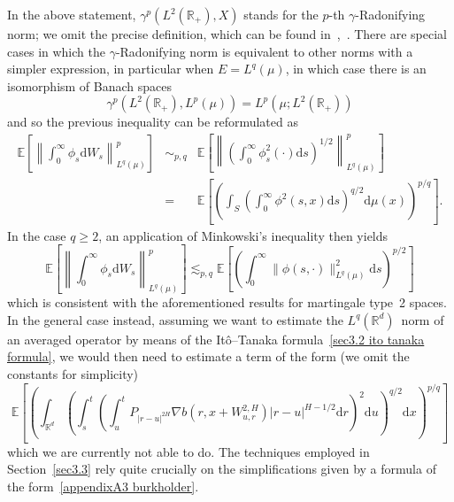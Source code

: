 \documentclass[10pt]{article}
\newcommand{\mathd}{\mathrm{d}}
\begin{document}
In the above statement, $\gamma^p (L^2 (\mathbb{R}_+), X)$ stands for the
$p$\mbox{-}th $\gamma$\mbox{-}Radonifying norm; we omit the precise
definition, which can be found
in~{\cite{vanneerven2007}},~{\cite{vanneerven2015}}. There are special cases
in which the $\gamma$-Radonifying norm is equivalent to other norms with a
simpler expression, in particular when $E = L^q (\mu)$, in which case there is
an isomorphism of Banach spaces
\[ \gamma^p (L^2 (\mathbb{R}_+), L^p (\mu)) = L^p (\mu ; L^2 (\mathbb{R}_+))
\]
and so the previous inequality can be reformulated as
\begin{eqnarray*}
  \mathbb{E} \left[ \left\| \int_0^{\infty} \phi_s \mathd W_s \right\|_{L^q
  (\mu)}^p \right] & \sim_{p, q} & \mathbb{E} \left[ \left\| \left(
  \int_0^{\infty} \phi_s^2 (\cdot) \mathd s \right)^{1 / 2} \right\|_{L^q
  (\mu)}^p \right]\\
  & = & \mathbb{E} \left[ \left( \int_S \left( \int_0^{\infty} \phi^2 (s, x)
  \mathd s \right)^{q / 2} \mathd \mu (x) \right)^{p / q} \right] .
\end{eqnarray*}
In the case $q \geqslant 2$, an application of Minkowski's inequality then
yields
\[ \mathbb{E} \left[ \left\| \int_0^{\infty} \phi_s \mathd W_s \right\|_{L^q
   (\mu)}^p \right] \lesssim_{p, q} \mathbb{E} \left[ \left( \int_0^{\infty}
   \| \phi (s, \cdot) \|_{L^q (\mu)}^2 \mathd s \right)^{p / 2} \right] \]
which is consistent with the aforementioned results for martingale type~2
spaces. In the general case instead, assuming we want to estimate the $L^q
(\mathbb{R}^d)$~norm of an averaged operator by means of the It\^{o}--Tanaka
formula~{\eqref{sec3.2 ito tanaka formula}}, we would then need to estimate a
term of the form (we omit the constants for simplicity)
\[ \mathbb{E} \left[ \left( \int_{\mathbb{R}^d} \left( \int_s^t \left(
   \int_u^t P_{| r - u |^{2 H}} \nabla b (r, x + W^{2, H}_{u, r})  | r - u
   |^{H - 1 / 2} \mathd r \right)^2 \mathd u \right)^{q / 2} \mathd x
   \right)^{p / q} \right] \]
which we are currently not able to do. The techniques employed in
Section~\ref{sec3.3} rely quite crucially on the simplifications given by a
formula of the form~{\eqref{appendixA3 burkholder}}.
\end{document}
